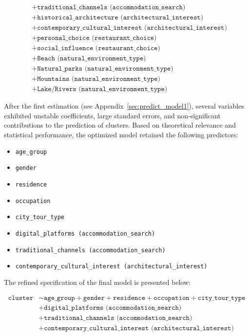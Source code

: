 \documentclass[a4paper, 12pt, twoside]{report}  %
\begin{document}
\begin{equation*}
\begin{aligned}
& + \texttt{traditional\_channels (accommodation\_search)} \\
& + \texttt{historical\_architecture (architectural\_interest)} \\
& + \texttt{contemporary\_cultural\_interest (architectural\_interest)} \\
& + \texttt{personal\_choice (restaurant\_choice)} \\
& + \texttt{social\_influence (restaurant\_choice)} \\
& + \texttt{Beach (natural\_environment\_type)} \\
& + \texttt{Natural\_parks (natural\_environment\_type)} \\
& + \texttt{Mountains (natural\_environment\_type)} \\
& + \texttt{Lake/Rivers (natural\_environment\_type)}
\end{aligned}
\end{equation*}

\indent After the first estimation (see Appendix~\ref{sec:predict_model1}), several variables exhibited unstable coefficients, large standard errors, and non-significant contributions to the prediction of clusters. Based on theoretical relevance and statistical performance, the optimized model retained the following predictors:

\begin{itemize}
\item \texttt{age\_group}
\item \texttt{gender}
\item \texttt{residence}
\item \texttt{occupation}
\item \texttt{city\_tour\_type}
\item \texttt{digital\_platforms (accommodation\_search)}
\item \texttt{traditional\_channels (accommodation\_search)}
\item \texttt{contemporary\_cultural\_interest (architectural\_interest)}
\end{itemize}

The refined specification of the final model is presented below:

\begin{align*}
\texttt{cluster} &\sim \texttt{age\_group} + \texttt{gender} + \texttt{residence} + \texttt{occupation} + \texttt{city\_tour\_type} \\
&+ \texttt{digital\_platforms (accommodation\_search)} \\
& + \texttt{traditional\_channels (accommodation\_search)} \\
&+ \texttt{contemporary\_cultural\_interest (architectural\_interest)}
\end{align*}
\end{document}
